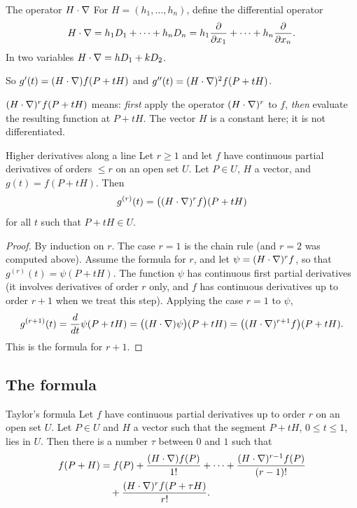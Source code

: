 \begin{definition}{The operator $H\cdot\nabla$}
For $H=(h_1,\dots,h_n)$, define the differential operator
\[ H\cdot\nabla=h_1D_1+\dots+h_nD_n=h_1\frac{\partial }{\partial x_1}+\dots+h_n\frac{\partial }{\partial x_n}. \]
In two variables $H\cdot\nabla=hD_1+kD_2$.
\end{definition}

So $g'(t)=(H\cdot\nabla)f(P+tH)$ and $g''(t)=(H\cdot\nabla)^2f(P+tH)$.

\begin{trap}
$(H\cdot\nabla)^rf(P+tH)$ means: \emph{first} apply the operator $(H\cdot\nabla)^r$ to $f$,
\emph{then} evaluate the resulting function at $P+tH$. The vector $H$ is a constant here;
it is not differentiated.
\end{trap}

\begin{theorem}[label=thm:gr]{Higher derivatives along a line}
Let $r\ge1$ and let $f$ have continuous partial derivatives of orders $\le r$ on an open set
$U$. Let $P\in U$, $H$ a vector, and $g(t)=f(P+tH)$. Then
\[ g^{(r)}(t)=\big((H\cdot\nabla)^rf\big)(P+tH) \]
for all $t$ such that $P+tH\in U$.
\end{theorem}

\begin{proof}
By induction on $r$. The case $r=1$ is the chain rule (and $r=2$ was computed above).
Assume the formula for $r$, and let $\psi=(H\cdot\nabla)^rf$, so that $g^{(r)}(t)=\psi(P+tH)$.
The function $\psi$ has continuous first partial derivatives (it involves derivatives of
order $r$ only, and $f$ has continuous derivatives up to order $r+1$ when we treat this
step). Applying the case $r=1$ to $\psi$,
\[ g^{(r+1)}(t)=\frac{d}{dt}\psi(P+tH)=\big((H\cdot\nabla)\psi\big)(P+tH)=\big((H\cdot\nabla)^{r+1}f\big)(P+tH). \]
This is the formula for $r+1$.
\end{proof}

\subsection{The formula}

\begin{theorem}[label=thm:taylor]{Taylor's formula}
Let $f$ have continuous partial derivatives up to order $r$ on an open set $U$. Let $P\in U$
and $H$ a vector such that the segment $P+tH$, $0\le t\le1$, lies in $U$. Then there is a
number $\tau$ between $0$ and $1$ such that
\begin{align*}
f(P+H)&=f(P)+\frac{(H\cdot\nabla)f(P)}{1!}+\dots+\frac{(H\cdot\nabla)^{r-1}f(P)}{(r-1)!}\\
&\quad+\frac{(H\cdot\nabla)^rf(P+\tau H)}{r!}.
\end{align*}
\end{theorem}

